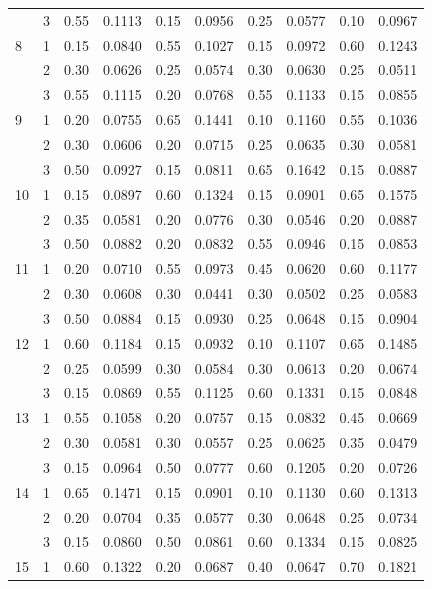 \begin{longtable}{llcccccccc}
   & 3 & 0.55 & 0.1113 & 0.15 & 0.0956 & 0.25 & 0.0577 & 0.10 & 0.0967 \\ 
  8 & 1 & 0.15 & 0.0840 & 0.55 & 0.1027 & 0.15 & 0.0972 & 0.60 & 0.1243 \\ 
   & 2 & 0.30 & 0.0626 & 0.25 & 0.0574 & 0.30 & 0.0630 & 0.25 & 0.0511 \\ 
   & 3 & 0.55 & 0.1115 & 0.20 & 0.0768 & 0.55 & 0.1133 & 0.15 & 0.0855 \\ 
  9 & 1 & 0.20 & 0.0755 & 0.65 & 0.1441 & 0.10 & 0.1160 & 0.55 & 0.1036 \\ 
   & 2 & 0.30 & 0.0606 & 0.20 & 0.0715 & 0.25 & 0.0635 & 0.30 & 0.0581 \\ 
   & 3 & 0.50 & 0.0927 & 0.15 & 0.0811 & 0.65 & 0.1642 & 0.15 & 0.0887 \\ 
  10 & 1 & 0.15 & 0.0897 & 0.60 & 0.1324 & 0.15 & 0.0901 & 0.65 & 0.1575 \\ 
   & 2 & 0.35 & 0.0581 & 0.20 & 0.0776 & 0.30 & 0.0546 & 0.20 & 0.0887 \\ 
   & 3 & 0.50 & 0.0882 & 0.20 & 0.0832 & 0.55 & 0.0946 & 0.15 & 0.0853 \\ 
  11 & 1 & 0.20 & 0.0710 & 0.55 & 0.0973 & 0.45 & 0.0620 & 0.60 & 0.1177 \\ 
   & 2 & 0.30 & 0.0608 & 0.30 & 0.0441 & 0.30 & 0.0502 & 0.25 & 0.0583 \\ 
   & 3 & 0.50 & 0.0884 & 0.15 & 0.0930 & 0.25 & 0.0648 & 0.15 & 0.0904 \\ 
  12 & 1 & 0.60 & 0.1184 & 0.15 & 0.0932 & 0.10 & 0.1107 & 0.65 & 0.1485 \\ 
   & 2 & 0.25 & 0.0599 & 0.30 & 0.0584 & 0.30 & 0.0613 & 0.20 & 0.0674 \\ 
   & 3 & 0.15 & 0.0869 & 0.55 & 0.1125 & 0.60 & 0.1331 & 0.15 & 0.0848 \\ 
  13 & 1 & 0.55 & 0.1058 & 0.20 & 0.0757 & 0.15 & 0.0832 & 0.45 & 0.0669 \\ 
   & 2 & 0.30 & 0.0581 & 0.30 & 0.0557 & 0.25 & 0.0625 & 0.35 & 0.0479 \\ 
   & 3 & 0.15 & 0.0964 & 0.50 & 0.0777 & 0.60 & 0.1205 & 0.20 & 0.0726 \\ 
  14 & 1 & 0.65 & 0.1471 & 0.15 & 0.0901 & 0.10 & 0.1130 & 0.60 & 0.1313 \\ 
   & 2 & 0.20 & 0.0704 & 0.35 & 0.0577 & 0.30 & 0.0648 & 0.25 & 0.0734 \\ 
   & 3 & 0.15 & 0.0860 & 0.50 & 0.0861 & 0.60 & 0.1334 & 0.15 & 0.0825 \\ 
  15 & 1 & 0.60 & 0.1322 & 0.20 & 0.0687 & 0.40 & 0.0647 & 0.70 & 0.1821 \\ 

\end{longtable}

